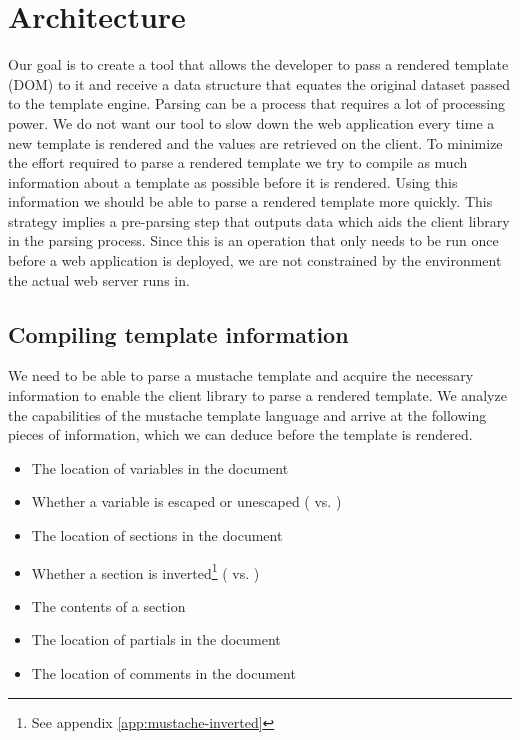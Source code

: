 \documentclass[thesis.tex]{subfiles}
\begin{document}
\chapter{Architecture}
\label{chap:architecture}

Our goal is to create a tool that allows the developer to pass a rendered
template (DOM) to it and receive a data structure that equates the original
dataset passed to the template engine.
Parsing can be a process that requires a lot of processing power. We do not want
our tool to slow down the web application every time a new template is rendered
and the values are retrieved on the client. To minimize the effort required to
parse a rendered template we try to compile as much information about a template
as possible before it is rendered. Using this information we should be able
to parse a rendered template more quickly.
This strategy implies a pre-parsing step that outputs data which aids
the client library in the parsing process. Since this is an operation
that only needs to be run once before a web application is deployed, we are not
constrained by the environment the actual web server runs in.

\section{Compiling template information}
\label{sec:arch-comp-tpl}
We need to be able to parse a mustache template and acquire the necessary
information to enable the client library to parse a rendered template.
We analyze the capabilities of the mustache template language and arrive
at the following pieces of information, which we can deduce before
the template is rendered.

\begin{itemize}
\item The location of variables in the document
\item Whether a variable is escaped or unescaped
	( vs. )
\item The location of sections in the document
\item Whether a section is
	inverted\footnote{See appendix \ref{app:mustache-inverted}}
	( vs. )
\item The contents of a section
\item The location of partials in the document
\item The location of comments in the document
\end{itemize}
\end{document}
